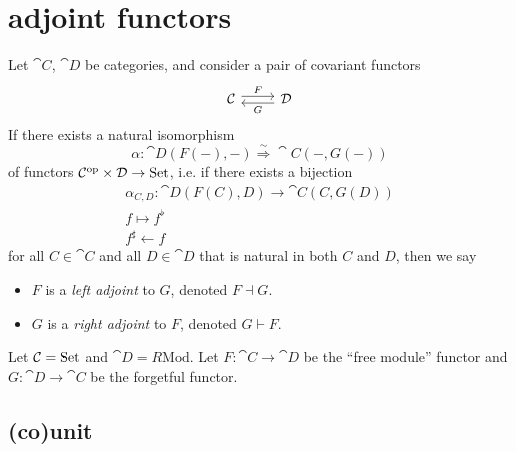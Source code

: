 \documentclass[12pt]{article}
\begin{document}

\section{adjoint functors} %

\begin{definition}
	Let $\cat{C}$, $\cat{D}$ be categories, and consider a pair of covariant functors 
	\begin{equation*}
\begin{tikzcd}
\mathcal{C} \arrow[r, "F", shift left] & \mathcal{D} \arrow[l, "G", shift left]
\end{tikzcd}
	\end{equation*}
	If there exists a natural isomorphism 
	\begin{equation*}
		\alpha: \cat{D}(F(-), -) \overset{\sim}{\Rightarrow} \cat{C}(-, G(-))
	\end{equation*}
	of functors $\mathcal{C}^{\text{op}}\times\mathcal{D}\to\text{Set}$, i.e. if there exists a bijection 
	\begin{gather*}
		\alpha_{C,D}: \cat{D}(F(C), D) \to \cat{C}(C, G(D)) \\
		f \mapsto f^\flat \\
		f^\sharp \leftarrow f
	\end{gather*}
	for all $C\in\cat{C}$ and all $D\in\cat{D}$ that is natural in both $C$ and $D$, then we say
	\begin{itemize}
		\item $F$ is a \emph{left adjoint} to $G$, denoted $F\dashv G$.
		\item $G$ is a \emph{right adjoint} to $F$, denoted $G\vdash F$.
	\end{itemize}
\end{definition}

\begin{example}
	Let $\mathcal{C}=\text{Set}$ and $\cat{D}=R\text{Mod}$. Let $F:\cat{C}\to\cat{D}$ be the ``free module'' functor and $G:\cat{D}\to\cat{C}$ be the forgetful functor.
\end{example}

\subsection{(co)unit} %
\end{document}
